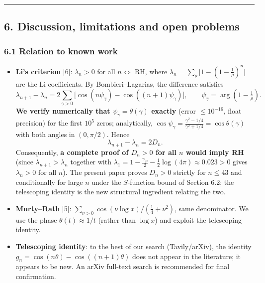 \documentclass[
]{article}
\begin{document}
\begin{center}\rule{0.5\linewidth}{0.5pt}\end{center}

\hypertarget{discussion-limitations-and-open-problems}{%
\subsection{6. Discussion, limitations and open
problems}\label{discussion-limitations-and-open-problems}}

\hypertarget{relation-to-known-work}{%
\subsubsection{6.1 Relation to known
work}\label{relation-to-known-work}}

\begin{itemize}
\item
  \textbf{Li's criterion} {[}6{]}: \(\lambda_n > 0\) for all \(n \iff\)
  RH, where \(\lambda_n = \sum_\rho\big[1-(1-\tfrac1\rho)^n\big]\) are
  the Li coefficients. By Bombieri--Lagarias, the difference satisfies
  \[\lambda_{n+1} - \lambda_n = 2\sum_{\gamma>0}\big[\cos(n\psi_\gamma) - \cos((n+1)\psi_\gamma)\big], \qquad \psi_\gamma = \arg(1-\tfrac1\rho).\]
  \textbf{We verify numerically that \(\psi_\gamma = \theta(\gamma)\)
  exactly} (error \(\le 10^{-16}\), float precision) for the first
  \(10^5\) zeros; analytically,
  \(\cos\psi_\gamma = \frac{\gamma^2-1/4}{\gamma^2+1/4} = \cos\theta(\gamma)\)
  with both angles in \((0,\pi/2)\). Hence
  \[\lambda_{n+1} - \lambda_n = 2D_n.\] Consequently, \textbf{a complete
  proof of \(D_n > 0\) for all \(n\) would imply RH} (since
  \(\lambda_{n+1}>\lambda_n\) together with
  \(\lambda_1 = 1-\frac{\gamma_E}{2}-\frac12\log(4\pi) \approx 0.023>0\)
  gives \(\lambda_n>0\) for all \(n\)). The present paper proves
  \(D_n>0\) strictly for \(n\le43\) and conditionally for large \(n\)
  under the \(S\)-function bound of Section 6.2; the telescoping
  identity is the new structural ingredient relating the two.
\item
  \textbf{Murty--Rath} {[}5{]}:
  \(\sum_{\nu>0}\cos(\nu\log x)/(\tfrac14+\nu^2)\), same denominator. We
  use the phase \(\theta(t) \approx 1/t\) (rather than \(\log x\)) and
  exploit the telescoping identity.
\item
  \textbf{Telescoping identity}: to the best of our search
  (Tavily/arXiv), the identity \(g_n = \cos(n\theta)-\cos((n+1)\theta)\)
  does not appear in the literature; it appears to be new. An arXiv
  full-text search is recommended for final confirmation.
\end{itemize}
\end{document}
